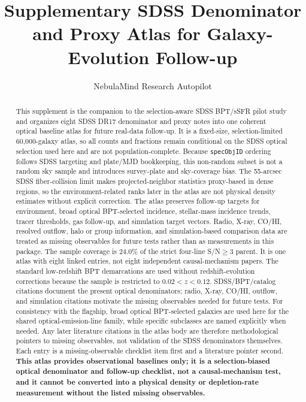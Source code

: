 \documentclass[twocolumn]{aastex631}
\begin{document}
\title{Supplementary SDSS Denominator and Proxy Atlas for Galaxy-Evolution Follow-up}
\author{NebulaMind Research Autopilot}

\begin{abstract}
This supplement is the companion to the selection-aware SDSS BPT/sSFR pilot study and organizes eight SDSS DR17 denominator and proxy notes into one coherent optical baseline atlas for future real-data follow-up. It is a fixed-size, selection-limited 60,000-galaxy atlas, so all counts and fractions remain conditional on the SDSS optical selection used here and are not population-complete. Because \texttt{specObjID} ordering follows SDSS targeting and plate/MJD bookkeeping, this non-random subset is not a random sky sample and introduces survey-plate and sky-coverage bias. The 55-arcsec SDSS fiber-collision limit makes projected-neighbor statistics proxy-based in dense regions, so the environment-related ranks later in the atlas are not physical density estimates without explicit correction. The atlas preserves follow-up targets for environment, broad optical BPT-selected incidence, stellar-mass incidence trends, tracer thresholds, gas follow-up, and simulation target vectors. Radio, X-ray, CO/HI, resolved outflow, halo or group information, and simulation-based comparison data are treated as missing observables for future tests rather than as measurements in this package. The sample coverage is 24.0\% of the strict four-line S/N$\geq3$ parent. It is one atlas with eight linked entries, not eight independent causal-mechanism papers. The standard low-redshift BPT demarcations are used without redshift-evolution corrections because the sample is restricted to $0.02<z<0.12$. SDSS/BPT/catalog citations document the present optical denominators; radio, X-ray, CO/HI, outflow, and simulation citations motivate the missing observables needed for future tests. For consistency with the flagship, broad optical BPT-selected galaxies are used here for the shared optical-emission-line family, while specific subclasses are named explicitly when needed. Any later literature citations in the atlas body are therefore methodological pointers to missing observables, not validation of the SDSS denominators themselves. Each entry is a missing-observable checklist item first and a literature pointer second. \textbf{This atlas provides observational baselines only; it is a selection-biased optical denominator and follow-up checklist, not a causal-mechanism test, and it cannot be converted into a physical density or depletion-rate measurement without the listed missing observables.}
\end{abstract}
\end{document}
